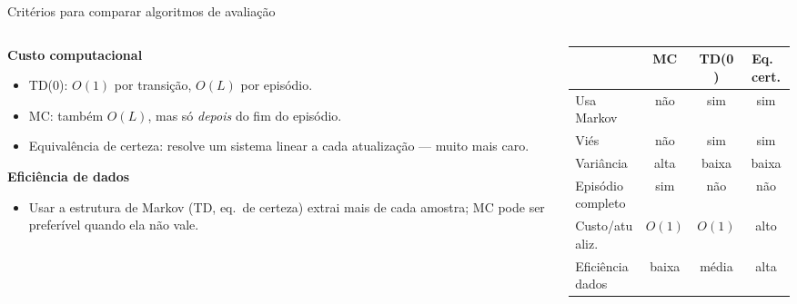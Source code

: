 \documentclass[aspectratio=169, 11pt]{beamer}
\begin{document}
\begin{frame}{Critérios para comparar algoritmos de avaliação}

  \begin{columns}[T]
    \begin{column}{0.52\textwidth}
      \textbf{Custo computacional}
      \begin{itemize}\setlength{\itemsep}{0.2ex}
        \item TD(0): $O(1)$ por transição, $O(L)$ por episódio.
        \item MC: também $O(L)$, mas só \emph{depois} do fim do episódio.
        \item Equivalência de certeza: resolve um sistema linear a cada
          atualização --- muito mais caro.
      \end{itemize}

      \smallskip
      \textbf{Eficiência de dados}
      \begin{itemize}\setlength{\itemsep}{0.2ex}
        \item Usar a estrutura de Markov (TD, eq.\ de certeza) extrai mais
          de cada amostra; MC pode ser preferível quando ela não vale.
      \end{itemize}
    \end{column}
    \begin{column}{0.48\textwidth}
      \begin{center}\footnotesize
      \begin{tabular}{lccc}
        \toprule
        & MC & TD(0) & Eq.\ cert. \\
        \midrule
        Usa Markov        & não & sim & sim \\
        Viés              & não & sim & sim \\
        Variância         & alta & baixa & baixa \\
        Episódio completo & sim & não & não \\
        Custo/atualiz.    & $O(1)$ & $O(1)$ & alto \\
        Eficiência dados  & baixa & média & alta \\
        \bottomrule
      \end{tabular}
      \end{center}

    \end{column}
  \end{columns}
\end{frame}
\end{document}
